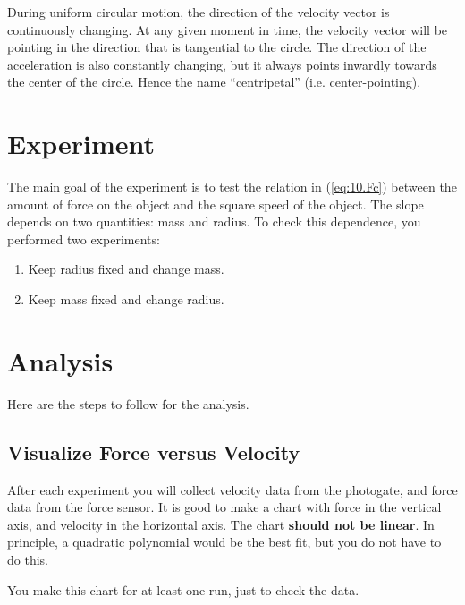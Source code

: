 During uniform circular motion, the direction of the velocity vector is continuously changing. At any given moment in time, the velocity vector will be pointing in the direction that is tangential to the circle. The direction of the acceleration is also constantly changing, but it always points inwardly towards the center of the circle. Hence the name ``centripetal'' (i.e. center-pointing).
%
\section{Experiment}
%
The main goal of the experiment is to test the relation in (\ref{eq:10.Fc}) between the amount of force on the object and the square speed of the object. The slope depends on two quantities: mass and radius. To check this dependence, you performed two experiments:
\begin{enumerate}
    \item Keep radius fixed and change mass.
    \item Keep mass fixed and change radius.
\end{enumerate}
%
\section{Analysis}
%
Here are the steps to follow for the analysis.
%
\subsection{Visualize Force versus Velocity}
%
After each experiment you will collect velocity data from the photogate, and force data from the force sensor. It is good to make a chart with force in the vertical axis, and velocity in the horizontal axis. The chart \textbf{should not be linear}. In principle, a quadratic polynomial would be the best fit, but you do not have to do this.

You make this chart for at least one run, just to check the data.
%
